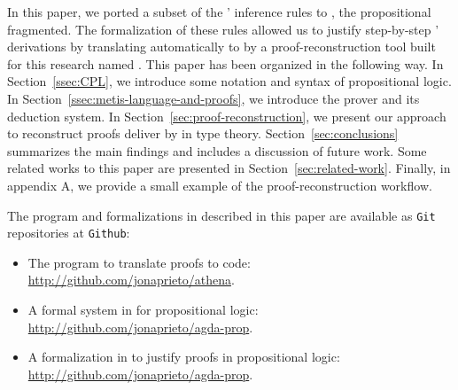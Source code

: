 \documentclass[../main.tex]{subfiles}
\begin{document}
In this paper, we ported a subset of the \Metis' inference rules to
\Agda, the propositional fragmented. The formalization of
these rules allowed us to justify step-by-step \Metis' \TSTP derivations by
translating automatically to \Agda by a proof-reconstruction tool built for
this research named \Athena.
This paper has been organized in the following way.
In Section~\ref{ssec:CPL}, we introduce some
notation and syntax of propositional logic.
In Section~\ref{ssec:metis-language-and-proofs}, we introduce the
\Metis prover and its deduction system.
In Section~\ref{sec:proof-reconstruction}, we present our
approach to reconstruct proofs deliver by \Metis in type theory.
Section~\ref{sec:conclusions} summarizes the main findings and includes a
discussion of future work.
Some related works to this paper are presented in Section~\ref{sec:related-work}.
Finally, in appendix \textsc{A}, we provide a small example of the
proof-reconstruction workflow.

The program and formalizations in \Agda described in this paper are available
as \verb!Git! repositories at \verb!Github!:

\begin{itemize}
  \item The \Athena program to translate \Metis proofs to \Agda code:\\
  \hfill\url{http://github.com/jonaprieto/athena}.\hfill
  \item A formal system in \Agda for propositional logic:\\
  \hfill\url{http://github.com/jonaprieto/agda-prop}.\hfill
  \item A formalization in \Agda to justify \Metis proofs in propositional
  logic:\\
  \hfill\url{http://github.com/jonaprieto/agda-prop}.\hfill
\end{itemize}
\end{document}
